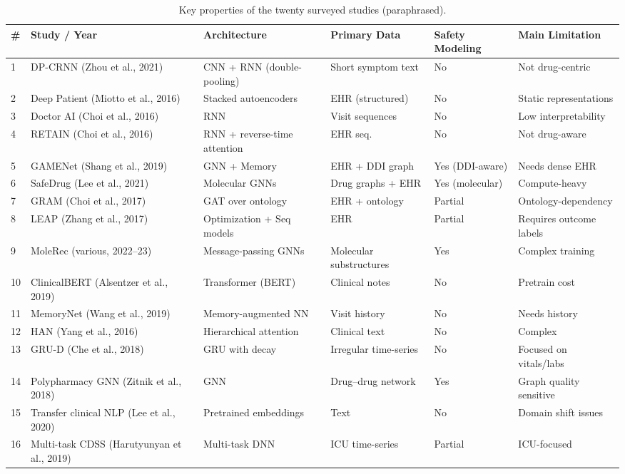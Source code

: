 \begin{table}
\centering
\caption{Key properties of the twenty surveyed studies (paraphrased).}
\label{tab:comparison}
\begin{tabularx}{\textwidth}{@{}l l X X X X@{}}
\toprule
\textbf{\#} & \textbf{Study / Year} & \textbf{Architecture} & \textbf{Primary Data} & \textbf{Safety Modeling} & \textbf{Main Limitation} \\
\midrule
1 & DP-CRNN (Zhou et al., 2021) & CNN + RNN (double-pooling) & Short symptom text & No & Not drug-centric \\
2 & Deep Patient (Miotto et al., 2016) & Stacked autoencoders & EHR (structured) & No & Static representations \\
3 & Doctor AI (Choi et al., 2016) & RNN & Visit sequences & No & Low interpretability \\
4 & RETAIN (Choi et al., 2016) & RNN + reverse-time attention & EHR seq. & No & Not drug-aware \\
5 & GAMENet (Shang et al., 2019) & GNN + Memory & EHR + DDI graph & Yes (DDI-aware) & Needs dense EHR \\
6 & SafeDrug (Lee et al., 2021) & Molecular GNNs & Drug graphs + EHR & Yes (molecular) & Compute-heavy \\
7 & GRAM (Choi et al., 2017) & GAT over ontology & EHR + ontology & Partial & Ontology-dependency \\
8 & LEAP (Zhang et al., 2017) & Optimization + Seq models & EHR & Partial & Requires outcome labels \\
9 & MoleRec (various, 2022–23) & Message-passing GNNs & Molecular substructures & Yes & Complex training \\
10 & ClinicalBERT (Alsentzer et al., 2019) & Transformer (BERT) & Clinical notes & No & Pretrain cost \\
11 & MemoryNet (Wang et al., 2019) & Memory-augmented NN & Visit history & No & Needs history \\
12 & HAN (Yang et al., 2016) & Hierarchical attention & Clinical text & No & Complex \\
13 & GRU-D (Che et al., 2018) & GRU with decay & Irregular time-series & No & Focused on vitals/labs \\
14 & Polypharmacy GNN (Zitnik et al., 2018) & GNN & Drug–drug network & Yes & Graph quality sensitive \\
15 & Transfer clinical NLP (Lee et al., 2020) & Pretrained embeddings & Text & No & Domain shift issues \\
16 & Multi-task CDSS (Harutyunyan et al., 2019) & Multi-task DNN & ICU time-series & Partial & ICU-focused \\

\end{tabularx}
\end{table}
